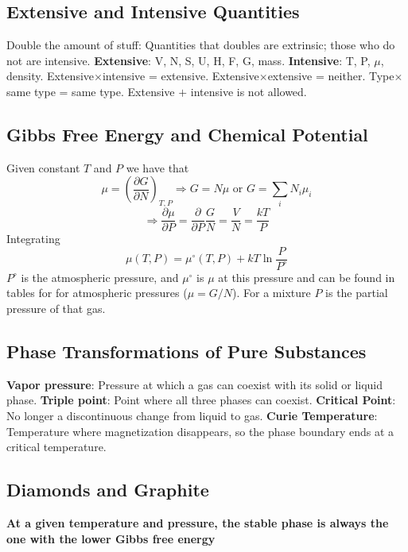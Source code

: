 \documentclass[a4paper,norsk, 10pt]{article}
\newcommand{\pd}[3]{\left(\frac{\partial #1}{\partial #2}\right)_{#3}}
\begin{document}
\subsection{Extensive and Intensive Quantities}
Double the amount of stuff: Quantities that doubles are extrinsic; those who do not are intensive. \textbf{Extensive}: V, N, S, U, H, F, G, mass. \textbf{Intensive}: T, P, $\mu$, density. Extensive$\times$intensive = extensive. Extensive$\times$extensive = neither. Type$\times$same type = same type. Extensive $+$ intensive is not allowed.
\subsection{Gibbs Free Energy and Chemical Potential}
Given constant $T$ and $P$ we have that
\begin{equation}
\mu = \pd{G}{N}{T,P} \Rightarrow G = N\mu \text{ or } G = \sum_i N_i \mu_i
\end{equation}
\begin{equation}
\Rightarrow\frac{\partial \mu}{\partial P} = \frac{\partial}{\partial P}\frac{G}{N} = \frac{V}{N} = \frac{kT}{P}
\end{equation}
Integrating
\begin{equation}
\mu(T,P) = \mu^\circ(T,P) + kT \ln\frac{P}{P^\circ}
\end{equation}
$P^\circ$ is the atmospheric pressure, and $\mu^\circ$ is $\mu$ at this pressure and can be found in tables for for atmospheric pressures ($\mu = G/N$).  For a mixture $P$ is the partial pressure of that gas.

\subsection{Phase Transformations of Pure Substances}
\textbf{Vapor pressure}: Pressure at which a gas can coexist with its solid or liquid phase. \textbf{Triple point}: Point where all three phases can coexist. \textbf{Critical Point}: No longer a discontinuous change from liquid to gas. \textbf{Curie Temperature}: Temperature where magnetization disappears, so the phase boundary ends at a critical temperature.

\subsection{Diamonds and Graphite}
\textbf{At a given temperature and pressure, the stable phase is always the one with the lower Gibbs free energy}
\end{document}
